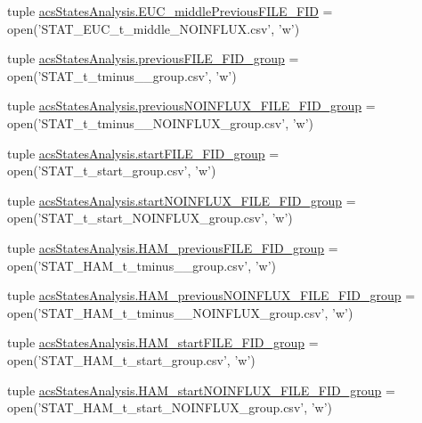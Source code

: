 \begin{DoxyCompactItemize}
\item 
tuple \hyperlink{a00130_afcb9ec3ed11cfcacae8f796af7605425}{acs\-States\-Analysis.\-E\-U\-C\-\_\-middle\-Previous\-F\-I\-L\-E\-\_\-\-F\-I\-D} = open('S\-T\-A\-T\-\_\-\-E\-U\-C\-\_\-t\-\_\-middle\-\_\-\-N\-O\-I\-N\-F\-L\-U\-X.\-csv', 'w')
\item 
tuple \hyperlink{a00130_a9e72c152be1f5aac24af10b353b16390}{acs\-States\-Analysis.\-previous\-F\-I\-L\-E\-\_\-\-F\-I\-D\-\_\-group} = open('S\-T\-A\-T\-\_\-t\-\_\-tminus\-\_\-\_\-group.\-csv', 'w')
\item 
tuple \hyperlink{a00130_a648b56a19ba8992cdb56d307ed22eb41}{acs\-States\-Analysis.\-previous\-N\-O\-I\-N\-F\-L\-U\-X\-\_\-\-F\-I\-L\-E\-\_\-\-F\-I\-D\-\_\-group} = open('S\-T\-A\-T\-\_\-t\-\_\-tminus\-\_\-\_\-\-N\-O\-I\-N\-F\-L\-U\-X\-\_\-group.\-csv', 'w')
\item 
tuple \hyperlink{a00130_addede16e21598cc53c446efa66bd20d9}{acs\-States\-Analysis.\-start\-F\-I\-L\-E\-\_\-\-F\-I\-D\-\_\-group} = open('S\-T\-A\-T\-\_\-t\-\_\-start\-\_\-group.\-csv', 'w')
\item 
tuple \hyperlink{a00130_a14eebfeaac72a017ee76d69b55033042}{acs\-States\-Analysis.\-start\-N\-O\-I\-N\-F\-L\-U\-X\-\_\-\-F\-I\-L\-E\-\_\-\-F\-I\-D\-\_\-group} = open('S\-T\-A\-T\-\_\-t\-\_\-start\-\_\-\-N\-O\-I\-N\-F\-L\-U\-X\-\_\-group.\-csv', 'w')
\item 
tuple \hyperlink{a00130_aa72272e636b1eafe39ed3367145433f2}{acs\-States\-Analysis.\-H\-A\-M\-\_\-previous\-F\-I\-L\-E\-\_\-\-F\-I\-D\-\_\-group} = open('S\-T\-A\-T\-\_\-\-H\-A\-M\-\_\-t\-\_\-tminus\-\_\-\_\-group.\-csv', 'w')
\item 
tuple \hyperlink{a00130_a092676cc95ddff57aac2aa077ce22d52}{acs\-States\-Analysis.\-H\-A\-M\-\_\-previous\-N\-O\-I\-N\-F\-L\-U\-X\-\_\-\-F\-I\-L\-E\-\_\-\-F\-I\-D\-\_\-group} = open('S\-T\-A\-T\-\_\-\-H\-A\-M\-\_\-t\-\_\-tminus\-\_\-\_\-\-N\-O\-I\-N\-F\-L\-U\-X\-\_\-group.\-csv', 'w')
\item 
tuple \hyperlink{a00130_ab74ecb2bab6a84c44274814862f2e96c}{acs\-States\-Analysis.\-H\-A\-M\-\_\-start\-F\-I\-L\-E\-\_\-\-F\-I\-D\-\_\-group} = open('S\-T\-A\-T\-\_\-\-H\-A\-M\-\_\-t\-\_\-start\-\_\-group.\-csv', 'w')
\item 
tuple \hyperlink{a00130_a4652c6dad393663e40970d7f6422c1d6}{acs\-States\-Analysis.\-H\-A\-M\-\_\-start\-N\-O\-I\-N\-F\-L\-U\-X\-\_\-\-F\-I\-L\-E\-\_\-\-F\-I\-D\-\_\-group} = open('S\-T\-A\-T\-\_\-\-H\-A\-M\-\_\-t\-\_\-start\-\_\-\-N\-O\-I\-N\-F\-L\-U\-X\-\_\-group.\-csv', 'w')
\item 

\end{DoxyCompactItemize}
